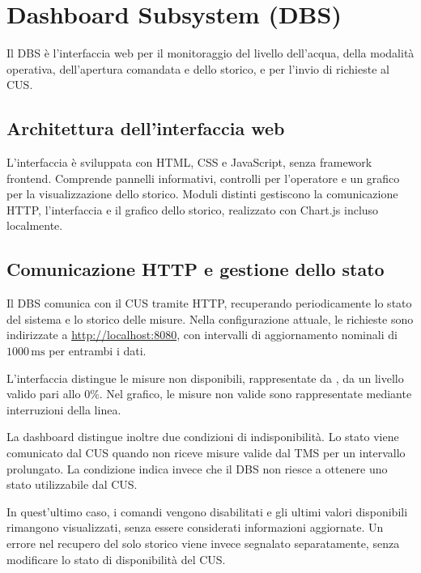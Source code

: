 
\section{Dashboard Subsystem (DBS)}%
\label{sec:dbs}

Il DBS è l'interfaccia web per il monitoraggio del livello dell'acqua, della modalità operativa, dell'apertura comandata e dello storico, e per l'invio di richieste al CUS.

\subsection{Architettura dell'interfaccia web}

L'interfaccia è sviluppata con HTML, CSS e JavaScript, senza framework frontend.
Comprende pannelli informativi, controlli per l'operatore e un grafico per la visualizzazione dello storico.
Moduli distinti gestiscono la comunicazione HTTP, l'interfaccia e il grafico dello storico, realizzato con Chart.js incluso localmente.

\subsection{Comunicazione HTTP e gestione dello stato}%
\label{subsec:dbs-state}

Il DBS comunica con il CUS tramite HTTP, recuperando periodicamente lo stato del sistema e lo storico delle misure.
Nella configurazione attuale, le richieste sono indirizzate a \url{http://localhost:8080}, con intervalli di aggiornamento nominali di \(1000\,\mathrm{ms}\) per entrambi i dati.

L'interfaccia distingue le misure non disponibili, rappresentate da , da un livello valido pari allo \(0\%\).
Nel grafico, le misure non valide sono rappresentate mediante interruzioni della linea.

La dashboard distingue inoltre due condizioni di indisponibilità.
Lo stato  viene comunicato dal CUS quando non riceve misure valide dal TMS per un intervallo prolungato.
La condizione  indica invece che il DBS non riesce a ottenere uno stato utilizzabile dal CUS.

In quest'ultimo caso, i comandi vengono disabilitati e gli ultimi valori disponibili rimangono visualizzati, senza essere considerati informazioni aggiornate.
Un errore nel recupero del solo storico viene invece segnalato separatamente, senza modificare lo stato di disponibilità del CUS.

